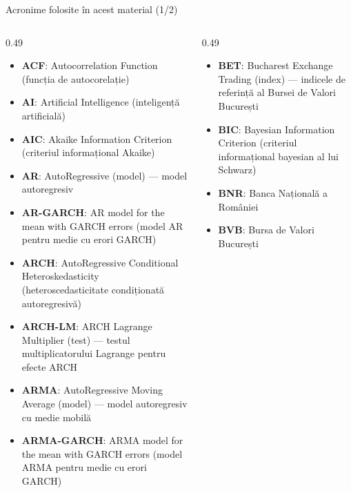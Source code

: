 {
\begin{frame}[noframenumbering]
    \titlepage
\end{frame}
}
\begin{frame}{Acronime folosite în acest material (1/2)}
\begin{columns}[T]
\begin{column}{0.49\textwidth}
\begin{itemize}\setlength{\itemsep}{0pt}
    \item \textbf{ACF}: Autocorrelation Function (funcția de autocorelație)
    \item \textbf{AI}: Artificial Intelligence (inteligență artificială)
    \item \textbf{AIC}: Akaike Information Criterion (criteriul informațional Akaike)
    \item \textbf{AR}: AutoRegressive (model) — model autoregresiv
    \item \textbf{AR-GARCH}: AR model for the mean with GARCH errors (model AR pentru medie cu erori GARCH)
    \item \textbf{ARCH}: AutoRegressive Conditional Heteroskedasticity (heteroscedasticitate condiționată autoregresivă)
    \item \textbf{ARCH-LM}: ARCH Lagrange Multiplier (test) — testul multiplicatorului Lagrange pentru efecte ARCH
    \item \textbf{ARMA}: AutoRegressive Moving Average (model) — model autoregresiv cu medie mobilă
    \item \textbf{ARMA-GARCH}: ARMA model for the mean with GARCH errors (model ARMA pentru medie cu erori GARCH)
\end{itemize}
\end{column}
\begin{column}{0.49\textwidth}
\begin{itemize}\setlength{\itemsep}{0pt}
    \item \textbf{BET}: Bucharest Exchange Trading (index) — indicele de referință al Bursei de Valori București
    \item \textbf{BIC}: Bayesian Information Criterion (criteriul informațional bayesian al lui Schwarz)
    \item \textbf{BNR}: Banca Națională a României
    \item \textbf{BVB}: Bursa de Valori București

\end{itemize}
\end{column}
\end{columns}
\end{frame}

